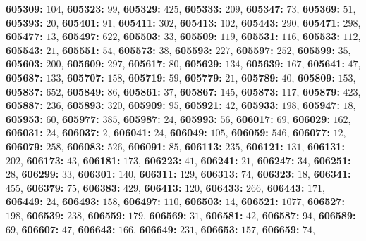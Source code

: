 \textsf{\bfseries 605309:} $104$, \textsf{\bfseries 605323:} $99$, \textsf{\bfseries 605329:} $425$, \textsf{\bfseries 605333:} $209$, \textsf{\bfseries 605347:} $73$, \textsf{\bfseries 605369:} $51$, \textsf{\bfseries 605393:} $20$, \textsf{\bfseries 605401:} $91$, \textsf{\bfseries 605411:} $302$, \textsf{\bfseries 605413:} $102$, \textsf{\bfseries 605443:} $290$, \textsf{\bfseries 605471:} $298$, \textsf{\bfseries 605477:} $13$, \textsf{\bfseries 605497:} $622$, \textsf{\bfseries 605503:} $33$, \textsf{\bfseries 605509:} $119$, \textsf{\bfseries 605531:} $116$, \textsf{\bfseries 605533:} $112$, \textsf{\bfseries 605543:} $21$, \textsf{\bfseries 605551:} $54$, \textsf{\bfseries 605573:} $38$, \textsf{\bfseries 605593:} $227$, \textsf{\bfseries 605597:} $252$, \textsf{\bfseries 605599:} $35$, \textsf{\bfseries 605603:} $200$, \textsf{\bfseries 605609:} $297$, \textsf{\bfseries 605617:} $80$, \textsf{\bfseries 605629:} $134$, \textsf{\bfseries 605639:} $167$, \textsf{\bfseries 605641:} $47$, \textsf{\bfseries 605687:} $133$, \textsf{\bfseries 605707:} $158$, \textsf{\bfseries 605719:} $59$, \textsf{\bfseries 605779:} $21$, \textsf{\bfseries 605789:} $40$, \textsf{\bfseries 605809:} $153$, \textsf{\bfseries 605837:} $652$, \textsf{\bfseries 605849:} $86$, \textsf{\bfseries 605861:} $37$, \textsf{\bfseries 605867:} $145$, \textsf{\bfseries 605873:} $117$, \textsf{\bfseries 605879:} $423$, \textsf{\bfseries 605887:} $236$, \textsf{\bfseries 605893:} $320$, \textsf{\bfseries 605909:} $95$, \textsf{\bfseries 605921:} $42$, \textsf{\bfseries 605933:} $198$, \textsf{\bfseries 605947:} $18$, \textsf{\bfseries 605953:} $60$, \textsf{\bfseries 605977:} $385$, \textsf{\bfseries 605987:} $24$, \textsf{\bfseries 605993:} $56$, \textsf{\bfseries 606017:} $69$, \textsf{\bfseries 606029:} $162$, \textsf{\bfseries 606031:} $24$, \textsf{\bfseries 606037:} $2$, \textsf{\bfseries 606041:} $24$, \textsf{\bfseries 606049:} $105$, \textsf{\bfseries 606059:} $546$, \textsf{\bfseries 606077:} $12$, \textsf{\bfseries 606079:} $258$, \textsf{\bfseries 606083:} $526$, \textsf{\bfseries 606091:} $85$, \textsf{\bfseries 606113:} $235$, \textsf{\bfseries 606121:} $131$, \textsf{\bfseries 606131:} $202$, \textsf{\bfseries 606173:} $43$, \textsf{\bfseries 606181:} $173$, \textsf{\bfseries 606223:} $41$, \textsf{\bfseries 606241:} $21$, \textsf{\bfseries 606247:} $34$, \textsf{\bfseries 606251:} $28$, \textsf{\bfseries 606299:} $33$, \textsf{\bfseries 606301:} $140$, \textsf{\bfseries 606311:} $129$, \textsf{\bfseries 606313:} $74$, \textsf{\bfseries 606323:} $18$, \textsf{\bfseries 606341:} $455$, \textsf{\bfseries 606379:} $75$, \textsf{\bfseries 606383:} $429$, \textsf{\bfseries 606413:} $120$, \textsf{\bfseries 606433:} $266$, \textsf{\bfseries 606443:} $171$, \textsf{\bfseries 606449:} $24$, \textsf{\bfseries 606493:} $158$, \textsf{\bfseries 606497:} $110$, \textsf{\bfseries 606503:} $14$, \textsf{\bfseries 606521:} $1077$, \textsf{\bfseries 606527:} $198$, \textsf{\bfseries 606539:} $238$, \textsf{\bfseries 606559:} $179$, \textsf{\bfseries 606569:} $31$, \textsf{\bfseries 606581:} $42$, \textsf{\bfseries 606587:} $94$, \textsf{\bfseries 606589:} $69$, \textsf{\bfseries 606607:} $47$, \textsf{\bfseries 606643:} $166$, \textsf{\bfseries 606649:} $231$, \textsf{\bfseries 606653:} $157$, \textsf{\bfseries 606659:} $74$, 
